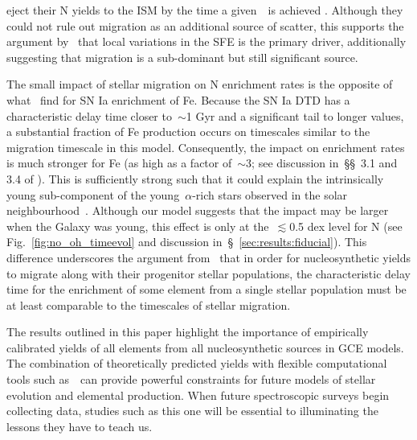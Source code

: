 \documentclass[ms.tex]{subfiles}
\begin{document}
eject their N yields to the ISM by the time a given~\oh~is achieved
\citep[e.g.][]{Molla2006, Vincenzo2016a}.
Although they could not rule out migration as an additional source of scatter,
this supports the argument by~\citet{Schaefer2020} that local variations in the
SFE is the primary driver, additionally suggesting that migration is a
sub-dominant but still significant source.
\par
The small impact of stellar migration on N enrichment rates is the opposite of
what~\citet{Johnson2021} find for SN Ia enrichment of Fe.
Because the SN Ia DTD has a characteristic delay time closer to~$\sim$1 Gyr
and a significant tail to longer values, a substantial fraction of Fe
production occurs on timescales similar to the migration timescale in this
model.
Consequently, the impact on enrichment rates is much stronger for Fe (as high
as a factor of~$\sim$3; see discussion in~\S\S~3.1 and 3.4 of
\citealp{Johnson2021}).
This is sufficiently strong such that it could explain the intrinsically young
sub-component of the young~$\alpha$-rich stars observed in the solar
neighbourhood~\citep{Chiappini2015, Martig2015, Martig2016, Jofre2016,
Yong2016, Izzard2018, SilvaAguirre2018, Warfield2021}.
Although our model suggests that the impact may be larger when the Galaxy was
young, this effect is only at the~$\lesssim$0.5 dex level for N (see
Fig.~\ref{fig:no_oh_timeevol} and discussion in~\S~\ref{sec:results:fiducial}).
This difference underscores the argument from~\citet{Johnson2021} that in order
for nucleosynthetic yields to migrate along with their progenitor stellar
populations, the characteristic delay time for the enrichment of some element
from a single stellar population must be at least comparable to the timescales
of stellar migration.
\par
The results outlined in this paper highlight the importance of empirically
calibrated yields of all elements from all nucleosynthetic sources in GCE
models.
The combination of theoretically predicted yields with flexible computational
tools such as~\vice~can provide powerful constraints for future models of
stellar evolution and elemental production.
When future spectroscopic surveys begin collecting data, studies such as this
one will be essential to illuminating the lessons they have to teach us.
\end{document}
